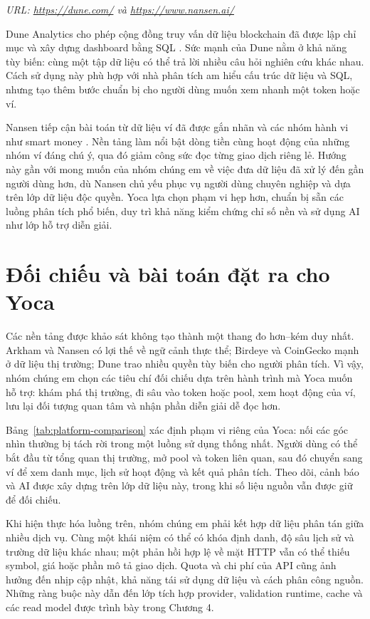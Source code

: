 \noindent\textit{URL: \url{https://dune.com/} và \url{https://www.nansen.ai/}}

Dune Analytics cho phép cộng đồng truy vấn dữ liệu blockchain đã được lập chỉ mục và xây dựng dashboard bằng SQL \cite{dune}. Sức mạnh của Dune nằm ở khả năng tùy biến: cùng một tập dữ liệu có thể trả lời nhiều câu hỏi nghiên cứu khác nhau. Cách sử dụng này phù hợp với nhà phân tích am hiểu cấu trúc dữ liệu và SQL, nhưng tạo thêm bước chuẩn bị cho người dùng muốn xem nhanh một token hoặc ví.

Nansen tiếp cận bài toán từ dữ liệu ví đã được gắn nhãn và các nhóm hành vi như smart money \cite{nansenai}. Nền tảng làm nổi bật dòng tiền cùng hoạt động của những nhóm ví đáng chú ý, qua đó giảm công sức đọc từng giao dịch riêng lẻ. Hướng này gần với mong muốn của nhóm chúng em về việc đưa dữ liệu đã xử lý đến gần người dùng hơn, dù Nansen chủ yếu phục vụ người dùng chuyên nghiệp và dựa trên lớp dữ liệu độc quyền. Yoca lựa chọn phạm vi hẹp hơn, chuẩn bị sẵn các luồng phân tích phổ biến, duy trì khả năng kiểm chứng chỉ số nền và sử dụng AI như lớp hỗ trợ diễn giải.

\section{Đối chiếu và bài toán đặt ra cho Yoca}
\label{sec:platform_comparison_and_problem}

Các nền tảng được khảo sát không tạo thành một thang đo hơn--kém duy nhất. Arkham và Nansen có lợi thế về ngữ cảnh thực thể; Birdeye và CoinGecko mạnh ở dữ liệu thị trường; Dune trao nhiều quyền tùy biến cho người phân tích. Vì vậy, nhóm chúng em chọn các tiêu chí đối chiếu dựa trên hành trình mà Yoca muốn hỗ trợ: khám phá thị trường, đi sâu vào token hoặc pool, xem hoạt động của ví, lưu lại đối tượng quan tâm và nhận phần diễn giải dễ đọc hơn.



Bảng~\ref{tab:platform-comparison} xác định phạm vi riêng của Yoca: nối các góc nhìn thường bị tách rời trong một luồng sử dụng thống nhất. Người dùng có thể bắt đầu từ tổng quan thị trường, mở pool và token liên quan, sau đó chuyển sang ví để xem danh mục, lịch sử hoạt động và kết quả phân tích. Theo dõi, cảnh báo và AI được xây dựng trên lớp dữ liệu này, trong khi số liệu nguồn vẫn được giữ để đối chiếu.

Khi hiện thực hóa luồng trên, nhóm chúng em phải kết hợp dữ liệu phân tán giữa nhiều dịch vụ. Cùng một khái niệm có thể có khóa định danh, độ sâu lịch sử và trường dữ liệu khác nhau; một phản hồi hợp lệ về mặt HTTP vẫn có thể thiếu symbol, giá hoặc phần mô tả giao dịch. Quota và chi phí của API cũng ảnh hưởng đến nhịp cập nhật, khả năng tái sử dụng dữ liệu và cách phân công nguồn. Những ràng buộc này dẫn đến lớp tích hợp provider, validation runtime, cache và các read model được trình bày trong Chương 4.

